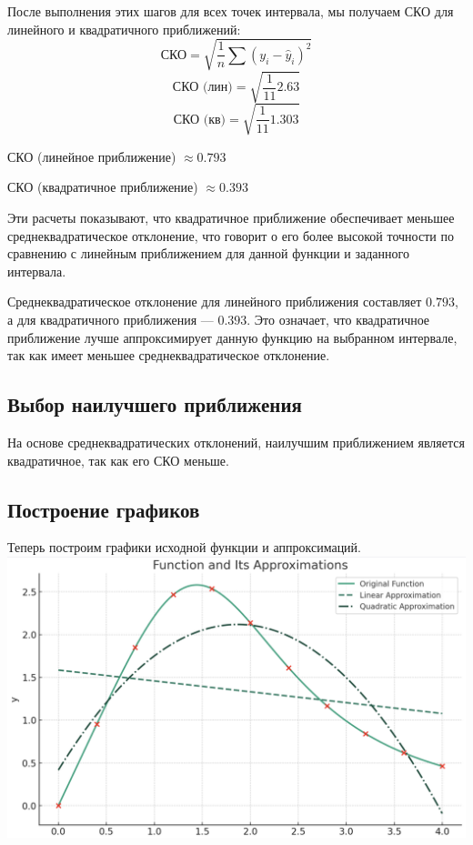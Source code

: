 \documentclass{article}
\begin{document}
            После выполнения этих шагов для всех точек интервала, мы получаем СКО для линейного и квадратичного приближений:
            \[
            \text{СКО} = \sqrt{\frac{1}{n} \sum (y_i - \hat{y}_i)^2}
            \]
            \[
            \text{СКО (лин)} = \sqrt{\frac{1}{11} 2.63}
            \]
            \[
            \text{СКО (кв)} = \sqrt{\frac{1}{11}1.303 }
            \]

            СКО (линейное приближение) $\approx 0.793$ 
            
            СКО (квадратичное приближение) $\approx 0.393$

            Эти расчеты показывают, что квадратичное приближение обеспечивает меньшее среднеквадратическое отклонение, что говорит о его более высокой точности по сравнению с линейным приближением для данной функции и заданного интервала.

            Среднеквадратическое отклонение для линейного приближения составляет $0.793$, а для квадратичного приближения — $0.393$. Это означает, что квадратичное приближение лучше аппроксимирует данную функцию на выбранном интервале, так как имеет меньшее среднеквадратическое отклонение.

      \subsection{Выбор наилучшего приближения}

            На основе среднеквадратических отклонений, наилучшим приближением является квадратичное, так как его СКО меньше.

      \subsection{Построение графиков}

            Теперь построим графики исходной функции и аппроксимаций.  
            \\
            \includegraphics[scale=0.4]{hand_approx.png} 
      
\end{document}
